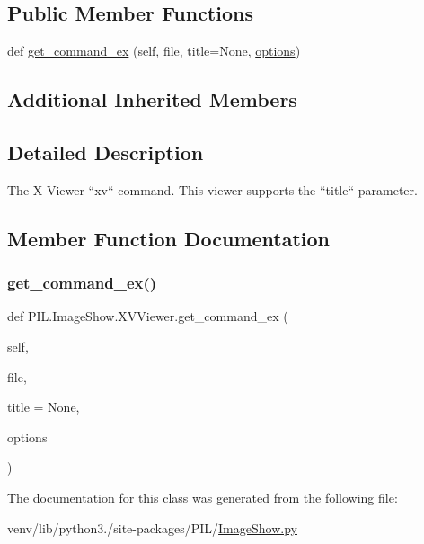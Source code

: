 \subsection*{Public Member Functions}
\begin{DoxyCompactItemize}
\item 
def \hyperlink{classPIL_1_1ImageShow_1_1XVViewer_ac8073113600dee42ac767ac4841b26f4}{get\+\_\+command\+\_\+ex} (self, file, title=None, \hyperlink{classPIL_1_1ImageShow_1_1UnixViewer_afbac95ff1c2d0ab0858163dd7e80671e}{options})
\end{DoxyCompactItemize}
\subsection*{Additional Inherited Members}


\subsection{Detailed Description}
\begin{DoxyVerb}The X Viewer ``xv`` command.
This viewer supports the ``title`` parameter.
\end{DoxyVerb}
 

\subsection{Member Function Documentation}
\mbox{\label{classPIL_1_1ImageShow_1_1XVViewer_ac8073113600dee42ac767ac4841b26f4}} 
\subsubsection{\texorpdfstring{get\+\_\+command\+\_\+ex()}{get\_command\_ex()}}
{\footnotesize\ttfamily def P\+I\+L.\+Image\+Show.\+X\+V\+Viewer.\+get\+\_\+command\+\_\+ex (\begin{DoxyParamCaption}\item[{}]{self,  }\item[{}]{file,  }\item[{}]{title = {\ttfamily None},  }\item[{}]{options }\end{DoxyParamCaption})}



The documentation for this class was generated from the following file\+:\begin{DoxyCompactItemize}
\item 
venv/lib/python3./site-\/packages/\+P\+I\+L/\hyperlink{ImageShow_8py}{Image\+Show.\+py}\end{DoxyCompactItemize}
